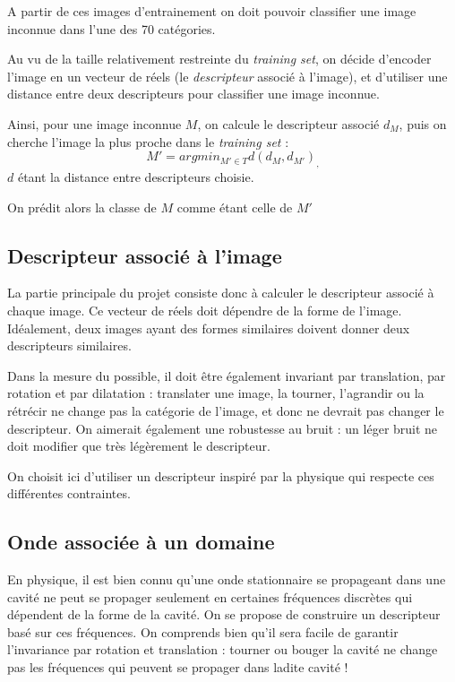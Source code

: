 \documentclass[a4paper,10pt]{article} %
\theoremstyle{definition} %
\begin{document}
A partir de ces images d'entrainement on doit pouvoir classifier une image inconnue dans l'une des 70 catégories.

Au vu de la taille relativement restreinte du \textit{training set}, on décide d'encoder l'image en un vecteur de réels (le \textit{descripteur} associé à l'image), et d'utiliser 
une distance entre deux descripteurs pour classifier une image inconnue.

Ainsi, pour une image inconnue $M$, on calcule le descripteur associé $d_M$, puis on cherche l'image la plus proche dans le \textit{training set} : $$M' = argmin_{M' \in T}{d(d_M, d_{M'})}_,   $$ $d$ étant la distance entre descripteurs choisie.

On prédit alors la classe de $M$ comme étant celle de $M'$


\subsection{Descripteur associé à l'image}

La partie principale du projet consiste donc à calculer le descripteur associé à chaque image. Ce vecteur de réels doit dépendre de la forme de l'image.
Idéalement, deux images ayant des formes similaires doivent donner deux descripteurs similaires.

Dans la mesure du possible, il doit être également invariant par translation, par rotation et par dilatation : translater une image, la tourner, l'agrandir ou la rétrécir ne change pas la catégorie de l'image, et donc ne devrait pas changer le descripteur.
On aimerait également une robustesse au bruit : un léger bruit ne doit modifier que très légèrement le descripteur.

On choisit ici d'utiliser un descripteur inspiré par la physique qui respecte ces différentes contraintes.

\subsection*{Onde associée à un domaine}

En physique, il est bien connu qu'une onde stationnaire se propageant dans une cavité ne peut se propager seulement en certaines fréquences discrètes qui dépendent de la forme de la cavité.
On se propose de construire un descripteur basé sur ces fréquences. On comprends bien qu'il sera facile de garantir l'invariance par rotation et translation : tourner ou bouger la cavité ne change pas les fréquences qui peuvent se propager dans ladite cavité !
\end{document}
